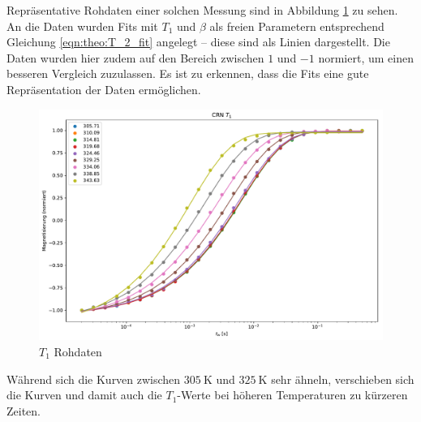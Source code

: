 Repräsentative Rohdaten einer solchen Messung sind in Abbildung \ref{fig:res:T_1_roh} zu sehen. An die Daten wurden Fits mit $T_1$ und $\beta$ als freien Parametern entsprechend Gleichung \eqref{eqn:theo:T_2_fit} angelegt -- diese sind als Linien dargestellt. Die Daten wurden hier zudem auf den Bereich zwischen $1$ und $-1$ normiert, um einen besseren Vergleich zuzulassen. Es ist zu erkennen, dass die Fits eine gute Repräsentation der Daten ermöglichen.
\begin{figure}
	\begin{center}
		\includegraphics[width=\textwidth]{graphics/plots/T1/t1_roh.pdf}
	\end{center}
	\caption{$T_1$ Rohdaten} \label{fig:res:T_1_roh}
\end{figure}
Während sich die Kurven zwischen $\SI{305}{\kelvin}$ und $\SI{325}{\kelvin}$ sehr ähneln, verschieben sich die Kurven und damit auch die $T_1$-Werte bei höheren Temperaturen zu kürzeren Zeiten.

